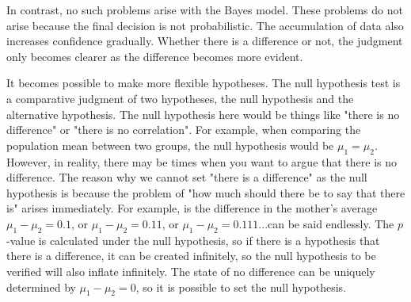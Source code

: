 \documentclass{ltjsbook}
\begin{document}
In contrast, no such problems arise with the Bayes model. These problems do not arise because the final decision is not probabilistic. The accumulation of data also increases confidence gradually. Whether there is a difference or not, the judgment only becomes clearer as the difference becomes more evident.

It becomes possible to make more flexible hypotheses.
The null hypothesis test is a comparative judgment of two hypotheses, the null hypothesis and the alternative hypothesis. The null hypothesis here would be things like "there is no difference" or "there is no correlation". For example, when comparing the population mean between two groups, the null hypothesis would be $\mu_1 = \mu_2$.
However, in reality, there may be times when you want to argue that there is no difference. The reason why we cannot set "there is a difference" as the null hypothesis is because the problem of "how much should there be to say that there is" arises immediately. For example, is the difference in the mother's average $\mu_1 - \mu_2 = 0.1$, or $\mu_1 - \mu_2 = 0.11$, or $\mu_1 - \mu_2 = 0.111$...can be said endlessly. The $p$-value is calculated under the null hypothesis, so if there is a hypothesis that there is a difference, it can be created infinitely, so the null hypothesis to be verified will also inflate infinitely. The state of no difference can be uniquely determined by $\mu_1 - \mu_2 = 0$, so it is possible to set the null hypothesis.
\end{document}
